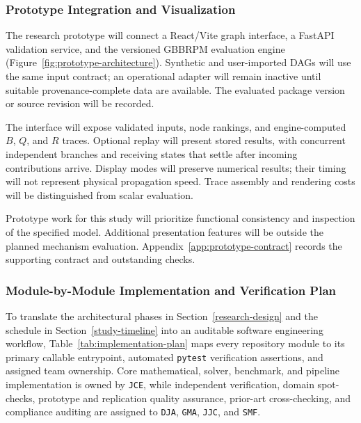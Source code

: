 \subsubsection{Prototype Integration and Visualization}

The research prototype will connect a React/Vite graph interface, a FastAPI
validation service, and the versioned GBBRPM evaluation engine
(Figure~\ref{fig:prototype-architecture}). Synthetic and user-imported DAGs
will use the same input contract; an operational adapter will remain inactive
until suitable provenance-complete data are available. The evaluated package
version or source revision will be recorded.



The interface will expose validated inputs, node rankings, and engine-computed
$B$, $Q$, and $R$ traces. Optional replay will present stored results, with
concurrent independent branches and receiving states that settle after incoming
contributions arrive. Display modes will preserve numerical results; their
timing will not represent physical propagation speed. Trace assembly and
rendering costs will be distinguished from scalar evaluation.

Prototype work for this study will prioritize functional consistency and
inspection of the specified model. Additional presentation features will be
outside the planned mechanism evaluation. Appendix~\ref{app:prototype-contract}
records the supporting contract and outstanding checks.

\subsubsection{Module-by-Module Implementation and Verification Plan}
\label{implementation-plan}

To translate the architectural phases in Section~\ref{research-design} and
the schedule in Section~\ref{study-timeline} into an auditable software
engineering workflow, Table~\ref{tab:implementation-plan} maps every
repository module to its primary callable entrypoint, automated
\texttt{pytest} verification assertions, and assigned team ownership. Core
mathematical, solver, benchmark, and pipeline implementation is owned by
\texttt{JCE}, while independent verification, domain spot-checks, prototype
and replication quality assurance, prior-art cross-checking, and compliance
auditing are assigned to \texttt{DJA}, \texttt{GMA}, \texttt{JJC}, and
\texttt{SMF}.

